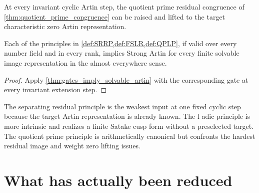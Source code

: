\begin{definition}\label{def:QPLP}
At every invariant cyclic Artin step, the quotient prime residual congruence of \cref{thm:quotient_prime_congruence} can be raised and lifted to the target characteristic zero Artin representation.
\end{definition}

\begin{theorem}\label{thm:any_principle_closes}
Each of the principles in \cref{def:SRRP,def:FSLR,def:QPLP}, if valid over every number field and in every rank, implies Strong Artin for every finite solvable image representation in the almost everywhere sense.
\end{theorem}

\begin{proof}
Apply \cref{thm:gates_imply_solvable_artin} with the corresponding gate at every invariant extension step.
\end{proof}

\begin{remark}\label{rem:three_target_scope}
The separating residual principle is the weakest input at one fixed cyclic step because the target Artin representation is already known. The l adic principle is more intrinsic and realizes a finite Satake cusp form without a preselected target. The quotient prime principle is arithmetically canonical but confronts the hardest residual image and weight zero lifting issues.
\end{remark}

\section{What has actually been reduced}\label{sec:reduction_ledger}

